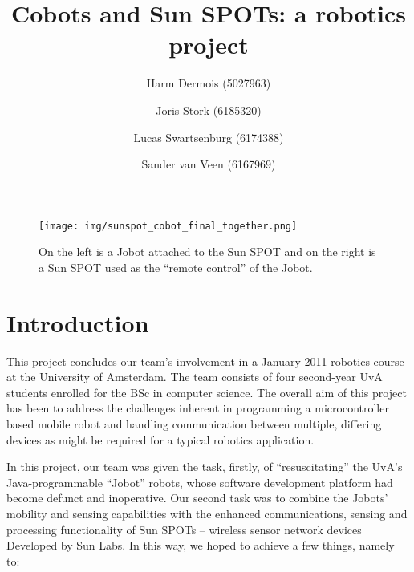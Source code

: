 \documentclass[a4paper,10pt]{article} %
\author{Harm Dermois (5027963) \and Joris Stork (6185320) \and
Lucas Swartsenburg (6174388) \and Sander van Veen (6167969)}
\title{Cobots and Sun SPOTs: a robotics project}
\begin{document}
\maketitle

\thispagestyle{empty}

\begin{figure}[H]
\label{fig:cobot_sunspot_final}
\centering
\texttt{[image: img/sunspot\_cobot\_final\_together.png]}
\caption{On the left is a Jobot attached to the Sun SPOT and on the right is a
Sun SPOT used as the ``remote control'' of the Jobot.}
\end{figure}


\pagebreak

\tableofcontents

\pagebreak

\section{Introduction} %

This project concludes our team's involvement in a January 2011 robotics course
at the University of Amsterdam. The team consists of four second-year UvA
students enrolled for the BSc in computer science. The overall aim of this
project has been to address the challenges inherent in programming a
microcontroller based mobile robot and handling communication between multiple,
differing devices as might be required for a typical robotics application.

In this project, our team was given the task, firstly, of ``resuscitating'' the
UvA's Java-programmable ``Jobot'' robots, whose software development platform
had become defunct and inoperative. Our second task was to combine the Jobots'
mobility and sensing capabilities with the enhanced communications, sensing and
processing functionality of Sun SPOTs -- wireless sensor network devices
Developed by Sun Labs. In this way, we hoped to achieve a few things, namely to:
\end{document}
